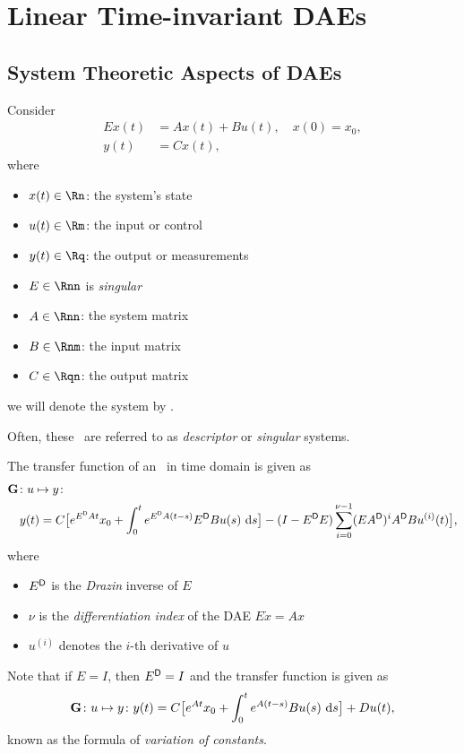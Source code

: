 \section{Linear Time-invariant DAEs}

\subsection{System Theoretic Aspects of DAEs}
Consider
\begin{align*}
	Ex(t) &= Ax(t) + Bu(t), \quad x(0) = x_0, \\
	y(t) &= Cx(t),
\end{align*}
where
\begin{itemize}
	\item $x(t) \in \Rn$: the system's state
	\item $u(t) \in \Rm$: the input or control
	\item $y(t) \in \Rq$: the output or measurements
	\item $E \in \Rnn$ is \emph{singular}
	\item $A \in \Rnn$: the system matrix
	\item $B \in \Rnm$: the input matrix
	\item $C \in \Rqn$: the output matrix
\end{itemize}
we will denote the system by \eabcsys.

Often, these \eabcsys~are referred to as \emph{descriptor} or \emph{singular} systems.

The transfer function of an \eabcsys~in time domain is given as
	\begin{align*}
		&\mathbf G \colon u \mapsto y\colon\\
		&\quad y(t) = C \bigl[e^{E^{\mathsf{D}} At}x_0 + \int_0^te^{E^{\mathsf{D}} A(t-s)}E^{\mathsf{D}} Bu(s)\text{~\textup{d}} s \bigr] - (I-E^{\mathsf{D}} E) \sum_{i=0}^{\nu-1}(EA^{\mathsf{D}} )^iA^{\mathsf{D}} Bu^{(i)}(t)\bigr] ,
	\end{align*}
	where
	\begin{itemize}
		\item $E^{\mathsf{D}}$ is the \emph{Drazin} inverse of $E$
		\item $\nu$ is the \emph{differentiation index} of the DAE $E\dot x = Ax$
		\item $u^{(i)}$ denotes the $i$-th derivative of $u$
	\end{itemize}

	Note that if $E=I$, then $E^{\mathsf{D}} = I$ and the transfer function is given as
	\begin{equation*}
		\mathbf G \colon u \mapsto y\colon y(t) = C \bigl[e^{At}x_0 + \int_0^te^{A(t-s)}Bu(s)\text{~\textup{d}} s \bigr]+ Du(t),
	\end{equation*}
	known as the formula of \emph{variation of constants}.


